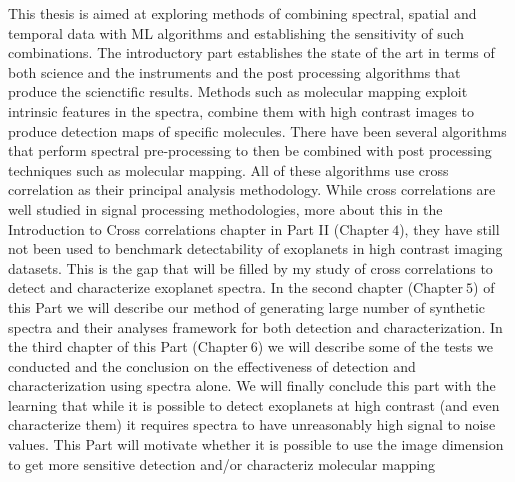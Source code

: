 This thesis is aimed at exploring methods of combining spectral, spatial and temporal data with ML algorithms and establishing the sensitivity 
of such combinations. 
The introductory part establishes the state of the art in terms of both science and the instruments and the post processing algorithms that produce the scienctific results.
Methods such as molecular mapping exploit intrinsic features in the spectra, combine them with high contrast images to produce detection maps of specific molecules.
There have been several algorithms \citep[e.g HRSDI][]{2019Haffert} that perform spectral pre-processing to then be combined with post processing techniques such as molecular mapping.
All of these algorithms use cross correlation as their principal analysis methodology. 
While cross correlations are well studied in signal processing methodologies, more about this in the Introduction to Cross correlations chapter in Part II (Chapter$~4$),
they have still not been used to benchmark detectability of exoplanets in high contrast imaging datasets.
This is the gap that will be filled by my study of cross correlations to detect and characterize exoplanet spectra.
In the second chapter (Chapter$~5$) of this Part we will describe our method of generating large number of synthetic spectra and their analyses framework for both detection and characterization.
In the third chapter of this Part (Chapter$~6$) we will describe some of the tests we conducted and the conclusion on the effectiveness of detection and characterization using spectra alone.
We will finally conclude this part with the learning that while it is possible to detect exoplanets at high contrast (and even characterize them) it requires spectra to have unreasonably high signal to noise values.
This Part will motivate whether it is possible to use the image dimension to get more sensitive detection and/or characteriz molecular mapping

